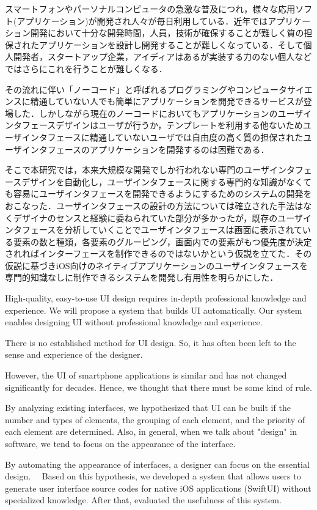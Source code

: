 
\begin{jabstract}

スマートフォンやパーソナルコンピュータの急激な普及につれ，様々な応用ソフト(アプリケーション)が開発され人々が毎日利用している．近年ではアプリケーション開発において十分な開発時間，人員，技術が確保することが難しく質の担保されたアプリケーションを設計し開発することが難しくなっている．そして個人開発者，スタートアップ企業，アイディアはあるが実装する力のない個人などではさらにこれを行うことが難しくなる．

その流れに伴い「ノーコード」と呼ばれるプログラミングやコンピュータサイエンスに精通していない人でも簡単にアプリケーションを開発できるサービスが登場した．しかしながら現在のノーコードにおいてもアプリケーションのユーザインタフェースデザインはユーザが行うか，テンプレートを利用する他ないためユーザインタフェースに精通していないユーザでは自由度の高く質の担保されたユーザインタフェースのアプリケーションを開発するのは困難である．

そこで本研究では，本来大規模な開発でしか行われない専門のユーザインタフェースデザインを自動化し，ユーザインタフェースに関する専門的な知識がなくても容易にユーザインタフェースを開発できるようにするためのシステムの開発をおこなった．ユーザインタフェースの設計の方法については確立された手法はなくデザイナのセンスと経験に委ねられていた部分が多かったが，既存のユーザインタフェースを分析していくことでユーザインタフェースは画面に表示されている要素の数と種類，各要素のグルーピング，画面内での要素がもつ優先度が決定されればインターフェースを制作できるのではないかという仮説を立てた．その仮説に基づきiOS向けのネイティブアプリケーションのユーザインタフェースを専門的知識なしに制作できるシステムを開発し有用性を明らかにした．
\end{jabstract}


\begin{eabstract}
High-quality, easy-to-use UI design requires in-depth professional knowledge and experience.
We will propose a system that builds UI automatically.  Our system enables designing UI without professional knowledge and experience.

There is no established method for UI design.
So, it has often been left to the sense and experience of the designer. 

    However, the UI of smartphone applications is similar and has not changed significantly for decades. 
Hence, we thought that there must be some kind of rule.

By analyzing existing interfaces, we hypothesized that  UI can be built if the number and types of elements, the grouping of each element, and the priority of each element are determined.
Also, in general, when we talk about "design" in software, we tend to focus on the appearance of the interface.

By automating the appearance of interfaces, a designer can focus on the essential design. 
　Based on this hypothesis, we developed a system that allows users to generate user interface source codes for native iOS applications (SwiftUI) without specialized knowledge.  
After that, evaluated the usefulness of this system.

\end{eabstract}
